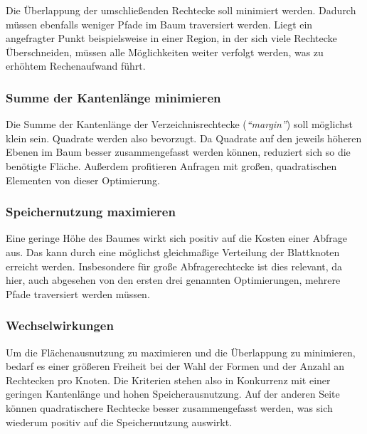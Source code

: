 \documentclass[runningheads,a4paper]{llncs}
\begin{document}
	Die Überlappung der umschließenden Rechtecke soll minimiert werden. Dadurch müssen ebenfalls weniger Pfade im Baum traversiert werden. Liegt ein angefragter Punkt beispielsweise in einer Region, in der sich viele Rechtecke Überschneiden, müssen alle Möglichkeiten weiter verfolgt werden, was zu erhöhtem Rechenaufwand führt.
	

	\subsubsection{Summe der Kantenlänge minimieren} %
	\label{ssub:kantenlaenge}

	Die Summe der Kantenlänge der Verzeichnisrechtecke (\emph{\enquote{margin}}) soll möglichst klein sein. Quadrate werden also bevorzugt. Da Quadrate auf den jeweils höheren Ebenen im Baum besser zusammengefasst werden können, reduziert sich so die benötigte Fläche.
	Außerdem profitieren Anfragen mit großen, quadratischen Elementen von dieser Optimierung. \citep[vgl.][323]{Beckmann:1990}
	

	\subsubsection{Speichernutzung maximieren} %
	\label{ssub:speichernutzung_maximieren}

	Eine geringe Höhe des Baumes wirkt sich positiv auf die Kosten einer Abfrage aus. Das kann durch eine möglichst gleichmaßige Verteilung der Blattknoten erreicht werden. Insbesondere für große Abfragerechtecke ist dies relevant, da hier, auch abgesehen von den ersten drei genannten Optimierungen, mehrere Pfade traversiert werden müssen. \citep[vgl.][323-324]{Beckmann:1990}
	

	\subsubsection{Wechselwirkungen} %
	\label{ssub:wechselwirkungen}

	Um die Flächenausnutzung zu maximieren und die Überlappung zu minimieren, bedarf es einer größeren Freiheit bei der Wahl der Formen und der Anzahl an Rechtecken pro Knoten. Die Kriterien stehen also in Konkurrenz mit einer geringen Kantenlänge und hohen Speicherausnutzung. Auf der anderen Seite können quadratischere Rechtecke besser zusammengefasst werden, was sich wiederum positiv auf die Speichernutzung auswirkt. \citep[vgl.][323-324]{Beckmann:1990}
	
\end{document}
